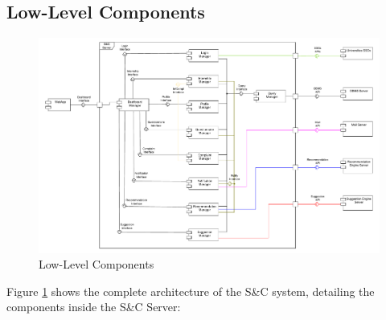 \subsection{Low-Level Components}
\label{sub:low-level-components}%

\begin{figure}[H]
      \centering
      \includegraphics[width=1.0\textwidth]{Images/Low_Level_Architectural_Design.pdf}
      \caption{Low-Level Components}
      \label{fig:low-level-components}
\end{figure}

\par Figure \ref{fig:low-level-components} shows the complete architecture of the S\&C system, detailing the components inside the S\&C Server:

